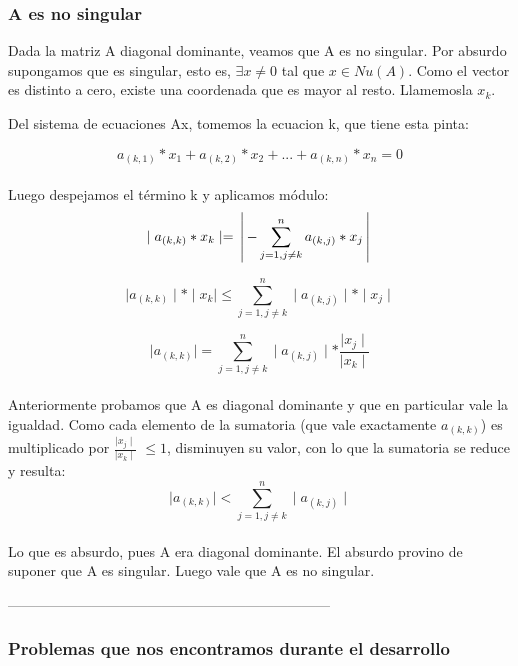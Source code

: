 \subsubsection{A es no singular}
Dada la matriz A diagonal dominante, veamos que A es no singular.
Por absurdo supongamos que es singular, esto es, $\exists x\neq 0$ tal que $x \in Nu(A)$.
Como el vector es distinto a cero, existe una coordenada que es mayor al resto. Llamemosla $x_{k}$.


Del sistema de ecuaciones Ax, tomemos la ecuacion k, que tiene esta pinta:                  

$$ a_{(k, 1)} * x_{1} + a_{(k, 2)} * x_{2} +... + a_{(k, n)} * x_{n} = 0 $$\\

Luego despejamos el término k y aplicamos módulo:\\

 $$ \mid a_{(k, k)} * x_{k} \mid  =  \left \arrowvert - \sum_{j=1,j\neq k}^{n}  a_{(k,j)} * x_{j} \right \arrowvert $$

 $$ \mid a_{(k, k)}\mid * \mid x_{k} \mid \leq \sum_{j=1,j\neq k}^{n} \mid a_{(k,j)}\mid * \mid x_{j} \mid $$


 $$ \mid a_{(k, k)}\mid  = \sum_{j=1,j\neq k}^{n} \mid a_{(k,j)}\mid *  \frac{\mid x_{j} \mid}{\mid x_{k} \mid}$$\\

Anteriormente probamos que A es diagonal dominante y que en particular vale la igualdad. Como cada elemento de la sumatoria (que vale exactamente $a_{(k, k)}$) es multiplicado por $\frac{\mid x_{j} \mid}{\mid x_{k} \mid}$ $\leq 1$, disminuyen su valor, con lo que la sumatoria se reduce y resulta:\\

$$\mid a_{(k,k)} \mid < \sum_{j=1, j\neq k}^{n}\mid a_{(k,j)} \mid $$\\

Lo que es absurdo, pues A era diagonal dominante. El absurdo provino de suponer que A es singular. Luego vale que A es no singular.




---------------------------------------------------------------------

\subsubsection{Problemas que nos encontramos durante el desarrollo}

